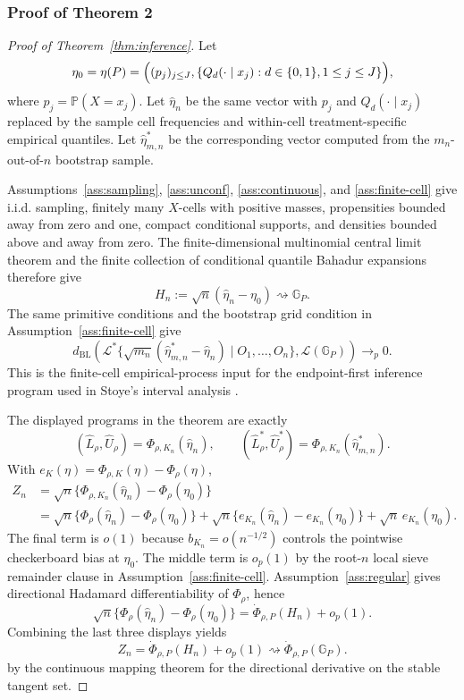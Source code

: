 \documentclass[11pt]{article}
\renewcommand{\Pr}{\mathbb{P}}
\theoremstyle{definition}
\theoremstyle{plain}
\theoremstyle{remark}
\begin{document}
\subsubsection*{Proof of Theorem 2}
\begin{proof}[Proof of Theorem~\ref{thm:inference}]
Let
\[
\eta_0=\eta(P)=\Bigl((p_j)_{j\le J},\{Q_d(\cdot\mid x_j):d\in\{0,1\},1\le j\le J\}\Bigr),
\]
where \(p_j=\Pr(X=x_j)\).  Let \(\widehat\eta_n\) be the same vector with \(p_j\) and \(Q_d(\cdot\mid x_j)\) replaced by the sample cell frequencies and within-cell treatment-specific empirical quantiles.  Let \(\widehat\eta_{m,n}^*\) be the corresponding vector computed from the \(m_n\)-out-of-\(n\) bootstrap sample.

Assumptions~\ref{ass:sampling}, \ref{ass:unconf}, \ref{ass:continuous}, and \ref{ass:finite-cell} give i.i.d. sampling, finitely many \(X\)-cells with positive masses, propensities bounded away from zero and one, compact conditional supports, and densities bounded above and away from zero.  The finite-dimensional multinomial central limit theorem and the finite collection of conditional quantile Bahadur expansions therefore give
\[
H_n:=\sqrt n(\widehat\eta_n-\eta_0)\rightsquigarrow\mathbb G_P.
\]
The same primitive conditions and the bootstrap grid condition in Assumption~\ref{ass:finite-cell} give
\[
d_{\mathrm{BL}}\!\left(
\mathcal L^*\{\sqrt{m_n}(\widehat\eta_{m,n}^*-\widehat\eta_n)\mid O_1,\ldots,O_n\},
\mathcal L(\mathbb G_P)
\right)\to_p0.
\]
This is the finite-cell empirical-process input for the endpoint-first inference program used in Stoye's interval analysis \cite{Stoye2009MoreCI}.

The displayed programs in the theorem are exactly
\[
(\widehat L_\rho,\widehat U_\rho)=\Phi_{\rho,K_n}(\widehat\eta_n),
\qquad
(\widehat L_\rho^*,\widehat U_\rho^*)=\Phi_{\rho,K_n}(\widehat\eta_{m,n}^*).
\]
With \(e_K(\eta)=\Phi_{\rho,K}(\eta)-\Phi_\rho(\eta)\),
\[
\begin{aligned}
Z_n
&=\sqrt n\{\Phi_{\rho,K_n}(\widehat\eta_n)-\Phi_\rho(\eta_0)\}\\
&=\sqrt n\{\Phi_\rho(\widehat\eta_n)-\Phi_\rho(\eta_0)\}
+\sqrt n\{e_{K_n}(\widehat\eta_n)-e_{K_n}(\eta_0)\}
+\sqrt n\,e_{K_n}(\eta_0).
\end{aligned}
\]
The final term is \(o(1)\) because \(b_{K_n}=o(n^{-1/2})\) controls the pointwise checkerboard bias at \(\eta_0\).  The middle term is \(o_p(1)\) by the root-\(n\) local sieve remainder clause in Assumption~\ref{ass:finite-cell}.  Assumption~\ref{ass:regular} gives directional Hadamard differentiability of \(\Phi_\rho\), hence
\[
\sqrt n\{\Phi_\rho(\widehat\eta_n)-\Phi_\rho(\eta_0)\}
=\dot\Phi_{\rho,P}(H_n)+o_p(1).
\]
Combining the last three displays yields
\[
Z_n=\dot\Phi_{\rho,P}(H_n)+o_p(1)
\rightsquigarrow \dot\Phi_{\rho,P}(\mathbb G_P).
\]
by the continuous mapping theorem for the directional derivative on the stable tangent set.


\end{proof}
\end{document}
